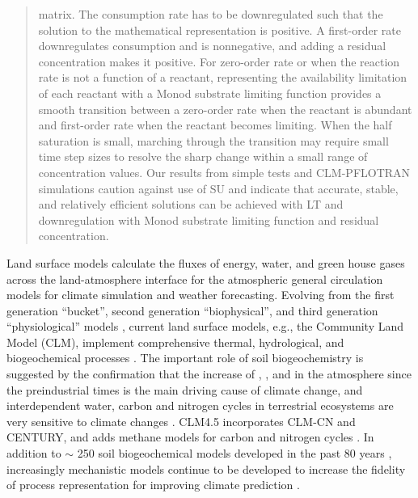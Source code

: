 \documentclass[gmd, manuscript]{copernicus}
\begin{document}
\begin{abstract}
matrix. The consumption rate has to be downregulated such that the solution to
the mathematical representation is positive. A first-order rate downregulates
consumption and is nonnegative, and adding a residual concentration makes it
positive. For zero-order rate or when the reaction rate is not a function of a
reactant, representing the availability limitation of each reactant with a
Monod substrate limiting function provides a smooth transition between a
zero-order rate when the reactant is abundant and first-order rate when the
reactant becomes limiting. When the half saturation is small, marching through
the transition may require small time step sizes to resolve the sharp change
within a small range of concentration values. Our results from simple
tests and CLM-PFLOTRAN simulations caution against use of SU and indicate that
accurate, stable, and relatively efficient solutions can be achieved with LT
and downregulation with Monod substrate limiting function and residual
concentration.
\end{abstract}

\clearpage

%

\introduction  %
Land surface models calculate the fluxes of energy, water, and green house
gases across the land-atmosphere interface for the atmospheric general
circulation models for climate simulation and weather forecasting. Evolving
from the first generation ``bucket'', second generation ``biophysical'', and
third generation ``physiological'' models \citep{Sellers1997,Seneviratne2010},
current land surface models, e.g., the Community Land Model (CLM), implement
comprehensive thermal, hydrological, and biogeochemical processes
\citep{Oleson2013}. The important role of soil biogeochemistry is suggested by
the confirmation that the increase of , , and 
in the atmosphere since the preindustrial times is the main driving cause of
climate change, and interdependent water, carbon and nitrogen cycles in
terrestrial ecosystems are very sensitive to climate changes \citep{IPCC2013}.
CLM4.5 incorporates CLM-CN and CENTURY, and adds methane models for carbon and
nitrogen cycles \citep{Oleson2013}. In addition to $\sim$ 250 soil biogeochemical
models developed in the past 80 years \citep{Manzoni2009}, increasingly
mechanistic models continue to be developed to increase the fidelity of
process representation for improving climate prediction
\citep[e.g.,][]{Wang2012,Riley2014}. 
\end{document}
